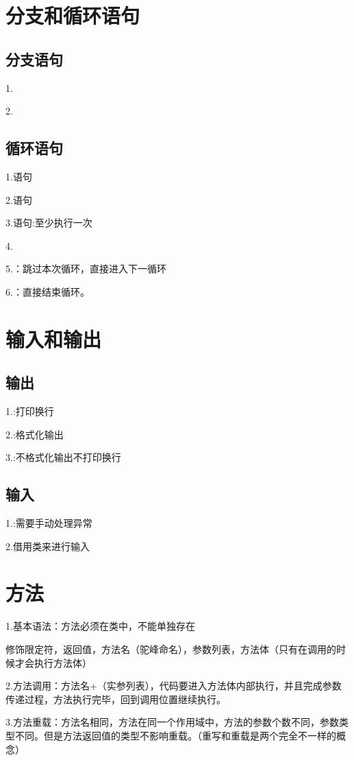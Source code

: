 \documentclass[a4paper]{report}
\begin{document}
\section{分支和循环语句}
\subsection{分支语句}
1.

2.
\subsection{循环语句}
1.语句

2.语句

3.语句:至少执行一次

4.

5.：跳过本次循环，直接进入下一循环

6.：直接结束循环。
\section{输入和输出}
\subsection{输出}
1.:打印换行

2.:格式化输出

3.:不格式化输出不打印换行

\subsection{输入}
1.:需要手动处理异常

2.借用类来进行输入

\section{方法}
1.基本语法：方法必须在类中，不能单独存在

修饰限定符，返回值，方法名（驼峰命名），参数列表，方法体（只有在调用的时候才会执行方法体）

2.方法调用：方法名+（实参列表），代码要进入方法体内部执行，并且完成参数传递过程，方法执行完毕，回到调用位置继续执行。

3.方法重载：方法名相同，方法在同一个作用域中，方法的参数个数不同，参数类型不同。但是方法返回值的类型不影响重载。（\textcolor[rgb]{1.00,0.00,0.00}{重写}和\textcolor[rgb]{1.00,0.00,0.00}{重载}是两个完全不一样的概念）
\end{document}
